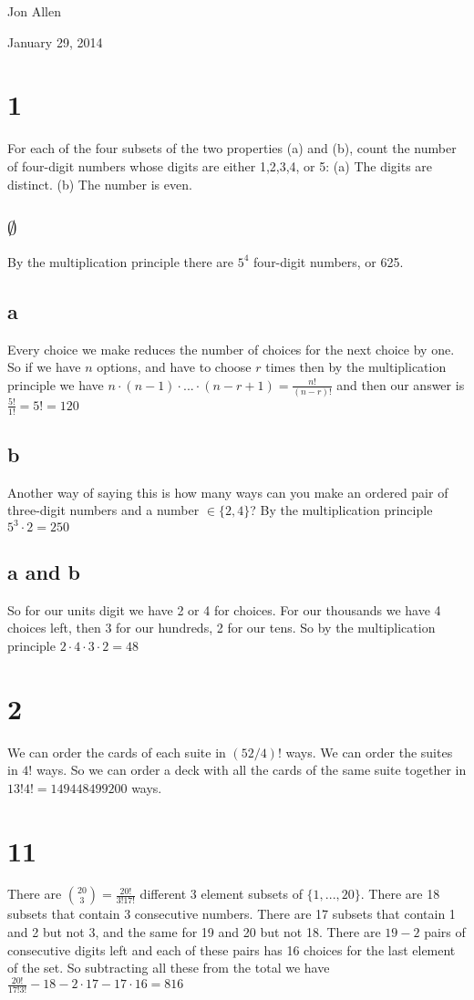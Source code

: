 \documentclass{article}
\begin{document}
Jon Allen

January 29, 2014

\section*{1}
For each of the four subsets of the two properties (a) and (b), count the number of four-digit numbers whose digits are either 1,2,3,4, or 5:
(a) The digits are distinct. (b) The number is even.
\subsection*{$\emptyset$}
By the multiplication principle there are $5^4$ four-digit numbers, or 625.
\subsection*{a}
Every choice we make reduces the number of choices for the next choice by one. So if we have $n$ options, and have to choose $r$ times then by the multiplication principle we have $n\cdot(n-1)\cdot...\cdot(n-r+1)=\frac{n!}{(n-r)!}$ and then our answer is $\frac{5!}{1!}=5!=120$
\subsection*{b}
Another way of saying this is how many ways can you make an ordered pair of three-digit numbers and a number $\in\{2,4\}$? By the multiplication principle $5^3\cdot2=250$
\subsection*{a and b}
So for our units digit we have 2 or 4 for choices. For our thousands we have 4 choices left, then 3 for our hundreds, 2 for our tens. So by the multiplication principle $2\cdot4\cdot3\cdot2=48$
\section*{2}
We can order the cards of each suite in $(52/4)!$ ways. We can order the suites in $4!$ ways. So we can order a deck with all the cards of the same suite together in $13!4!=149448499200$ ways.
\section*{11}
There are ${20 \choose 3}=\frac{20!}{3!17!}$ different 3 element subsets of $\{1,...,20\}$. There are 18 subsets that contain 3 consecutive numbers. There are 17 subsets that contain 1 and 2 but not 3, and the same for 19 and 20 but not 18. There are $19-2$ pairs of consecutive digits left and each of these pairs has 16 choices for the last element of the set. So subtracting all these from the total we have $\frac{20!}{17!3!}-18-2\cdot17-17\cdot16=816$
\end{document}
